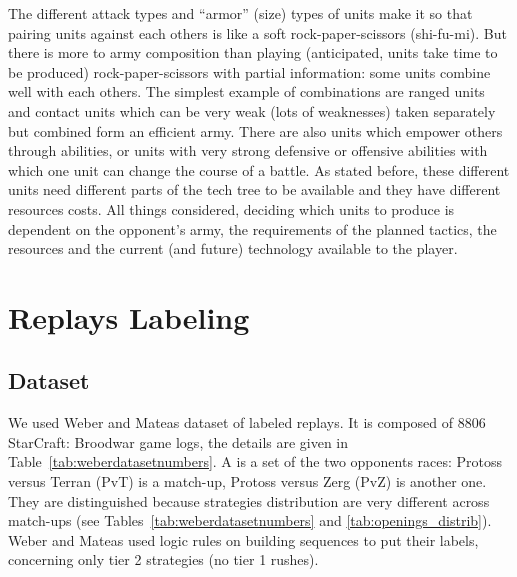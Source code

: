 The different attack types and ``armor'' (size) types of units make it so that pairing units against each others is like a soft rock-paper-scissors (shi-fu-mi). But there is more to army composition than playing (anticipated, units take time to be produced) rock-paper-scissors with partial information: some units combine well with each others. The simplest example of combinations are ranged units and contact units which can be very weak (lots of weaknesses) taken separately but combined form an efficient army. There are also units which empower others through abilities, or units with very strong defensive or offensive abilities with which one unit can change the course of a battle. As stated before, these different units need different parts of the tech tree to be available and they have different resources costs. All things considered, deciding which units to produce is dependent on the opponent's army, the requirements of the planned tactics, the resources and the current (and future) technology available to the player.

\section{Replays Labeling}

\subsection{Dataset}

We used Weber and Mateas \citep{weberStrat} dataset of labeled replays. It is composed of 8806 StarCraft: Broodwar game logs, the details are given in Table~\ref{tab:weberdatasetnumbers}. A  is a set of the two opponents races: Protoss versus Terran (PvT) is a match-up, Protoss versus Zerg (PvZ) is another one. They are distinguished because strategies distribution are very different across match-ups (see Tables~\ref{tab:weberdatasetnumbers} and \ref{tab:openings_distrib}). Weber and Mateas used logic rules on building sequences to put their labels, concerning only tier 2 strategies (no tier 1 rushes).

